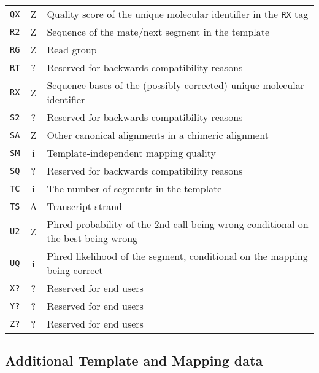 \documentclass[10pt]{article}
\begin{document}
\begin{center}
\begin{longtable}{ccp{12.5cm}}
  {\tt QX} & Z & Quality score of the unique molecular identifier in the {\tt RX} tag \\
  {\tt R2} & Z & Sequence of the mate/next segment in the template \\
  {\tt RG} & Z & Read group \\
  {\tt RT} & ? & Reserved for backwards compatibility reasons \\
  {\tt RX} & Z & Sequence bases of the (possibly corrected) unique molecular identifier \\
  {\tt S2} & ? & Reserved for backwards compatibility reasons \\
  {\tt SA} & Z & Other canonical alignments in a chimeric alignment \\
  {\tt SM} & i & Template-independent mapping quality \\
  {\tt SQ} & ? & Reserved for backwards compatibility reasons \\
  {\tt TC} & i & The number of segments in the template \\
  {\tt TS} & A & Transcript strand \\
  {\tt U2} & Z & Phred probability of the 2nd call being wrong conditional on the best being wrong \\
  {\tt UQ} & i & Phred likelihood of the segment, conditional on the mapping being correct \\
  {\tt X?} & ? & Reserved for end users \\
  {\tt Y?} & ? & Reserved for end users \\
  {\tt Z?} & ? & Reserved for end users \\
  \hline
\end{longtable}
\end{center}

\subsection{Additional Template and Mapping data}
\end{document}
